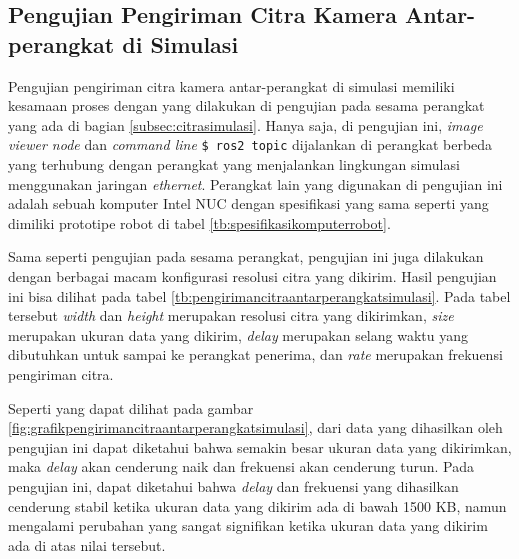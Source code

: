 \subsection{Pengujian Pengiriman Citra Kamera Antar-perangkat di Simulasi}
\label{subsec:citraantarperangkatsimulasi}

Pengujian pengiriman citra kamera antar-perangkat di simulasi memiliki kesamaan proses dengan yang dilakukan di pengujian pada sesama perangkat yang ada di bagian \ref{subsec:citrasimulasi}.
Hanya saja, di pengujian ini, \emph{image viewer node} dan \emph{command line} \lstinline{$ ros2 topic} dijalankan di perangkat berbeda yang terhubung dengan perangkat yang menjalankan lingkungan simulasi menggunakan jaringan \emph{ethernet}.
Perangkat lain yang digunakan di pengujian ini adalah sebuah komputer Intel NUC dengan spesifikasi yang sama seperti yang dimiliki prototipe robot di tabel \ref{tb:spesifikasikomputerrobot}.

Sama seperti pengujian pada sesama perangkat,
  pengujian ini juga dilakukan dengan berbagai macam konfigurasi resolusi citra yang dikirim.
Hasil pengujian ini bisa dilihat pada tabel \ref{tb:pengirimancitraantarperangkatsimulasi}.
Pada tabel tersebut \emph{width} dan \emph{height} merupakan resolusi citra yang dikirimkan,
  \emph{size} merupakan ukuran data yang dikirim,
  \emph{delay} merupakan selang waktu yang dibutuhkan untuk sampai ke perangkat penerima,
  dan \emph{rate} merupakan frekuensi pengiriman citra.

Seperti yang dapat dilihat pada gambar \ref{fig:grafikpengirimancitraantarperangkatsimulasi},
  dari data yang dihasilkan oleh pengujian ini dapat diketahui bahwa semakin besar ukuran data yang dikirimkan,
  maka \emph{delay} akan cenderung naik dan frekuensi akan cenderung turun.
Pada pengujian ini, dapat diketahui bahwa \emph{delay} dan frekuensi yang dihasilkan cenderung stabil ketika ukuran data yang dikirim ada di bawah 1500 KB,
  namun mengalami perubahan yang sangat signifikan ketika ukuran data yang dikirim ada di atas nilai tersebut.




